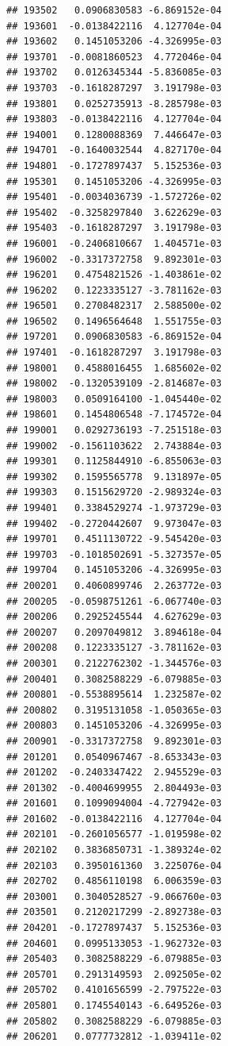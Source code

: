 \begin{frame}[fragile]
\begin{verbatim}
## 193502   0.0906830583 -6.869152e-04
## 193601  -0.0138422116  4.127704e-04
## 193602   0.1451053206 -4.326995e-03
## 193701  -0.0081860523  4.772046e-04
## 193702   0.0126345344 -5.836085e-03
## 193703  -0.1618287297  3.191798e-03
## 193801   0.0252735913 -8.285798e-03
## 193803  -0.0138422116  4.127704e-04
## 194001   0.1280088369  7.446647e-03
## 194701  -0.1640032544  4.827170e-04
## 194801  -0.1727897437  5.152536e-03
## 195301   0.1451053206 -4.326995e-03
## 195401  -0.0034036739 -1.572726e-02
## 195402  -0.3258297840  3.622629e-03
## 195403  -0.1618287297  3.191798e-03
## 196001  -0.2406810667  1.404571e-03
## 196002  -0.3317372758  9.892301e-03
## 196201   0.4754821526 -1.403861e-02
## 196202   0.1223335127 -3.781162e-03
## 196501   0.2708482317  2.588500e-02
## 196502   0.1496564648  1.551755e-03
## 197201   0.0906830583 -6.869152e-04
## 197401  -0.1618287297  3.191798e-03
## 198001   0.4588016455  1.685602e-02
## 198002  -0.1320539109 -2.814687e-03
## 198003   0.0509164100 -1.045440e-02
## 198601   0.1454806548 -7.174572e-04
## 199001   0.0292736193 -7.251518e-03
## 199002  -0.1561103622  2.743884e-03
## 199301   0.1125844910 -6.855063e-03
## 199302   0.1595565778  9.131897e-05
## 199303   0.1515629720 -2.989324e-03
## 199401   0.3384529274 -1.973729e-03
## 199402  -0.2720442607  9.973047e-03
## 199701   0.4511130722 -9.545420e-03
## 199703  -0.1018502691 -5.327357e-05
## 199704   0.1451053206 -4.326995e-03
## 200201   0.4060899746  2.263772e-03
## 200205  -0.0598751261 -6.067740e-03
## 200206   0.2925245544  4.627629e-03
## 200207   0.2097049812  3.894618e-04
## 200208   0.1223335127 -3.781162e-03
## 200301   0.2122762302 -1.344576e-03
## 200401   0.3082588229 -6.079885e-03
## 200801  -0.5538895614  1.232587e-02
## 200802   0.3195131058 -1.050365e-03
## 200803   0.1451053206 -4.326995e-03
## 200901  -0.3317372758  9.892301e-03
## 201201   0.0540967467 -8.653343e-03
## 201202  -0.2403347422  2.945529e-03
## 201302  -0.4004699955  2.804493e-03
## 201601   0.1099094004 -4.727942e-03
## 201602  -0.0138422116  4.127704e-04
## 202101  -0.2601056577 -1.019598e-02
## 202102   0.3836850731 -1.389324e-02
## 202103   0.3950161360  3.225076e-04
## 202702   0.4856110198  6.006359e-03
## 203001   0.3040528527 -9.066760e-03
## 203501   0.2120217299 -2.892738e-03
## 204201  -0.1727897437  5.152536e-03
## 204601   0.0995133053 -1.962732e-03
## 205403   0.3082588229 -6.079885e-03
## 205701   0.2913149593  2.092505e-02
## 205702   0.4101656599 -2.797522e-03
## 205801   0.1745540143 -6.649526e-03
## 205802   0.3082588229 -6.079885e-03
## 206201   0.0777732812 -1.039411e-02

\end{verbatim}
\end{frame}

